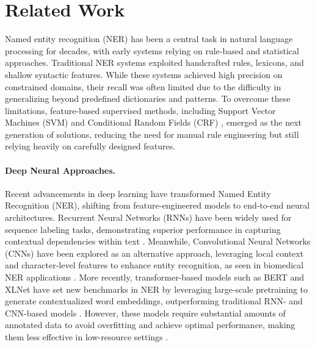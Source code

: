 \section{Related Work}
Named entity recognition (NER) has been a central task in natural language processing for decades, with early systems relying on rule-based and statistical approaches. Traditional NER systems \cite{Senapati2013Named-Entity, Danhui2014Rule-based, Sanglikar2011Named} exploited handcrafted rules, lexicons, and shallow syntactic features. While these systems achieved high precision on constrained domains, their recall was often limited due to the difficulty in generalizing beyond predefined dictionaries and patterns. To overcome these limitations, feature-based supervised methods, including Support Vector Machines (SVM) \cite{Lin2006Chinese, Paper2015A} and Conditional Random Fields (CRF) \cite{Guodong2011Geospatial, Tan2023Named}, emerged as the next generation of solutions, reducing the need for manual rule engineering but still relying heavily on carefully designed features.

\paragraph{Deep Neural Approaches.}  
Recent advancements in deep learning have transformed Named Entity Recognition (NER), shifting from feature-engineered models to end-to-end neural architectures. Recurrent Neural Networks (RNNs) have been widely used for sequence labeling tasks, demonstrating superior performance in capturing contextual dependencies within text \cite{Wu2017Clinical}. Meanwhile, Convolutional Neural Networks (CNNs) have been explored as an alternative approach, leveraging local context and character-level features to enhance entity recognition, as seen in biomedical NER applications \cite{Zhu2017GRAM}. More recently, transformer-based models such as BERT and XLNet have set new benchmarks in NER by leveraging large-scale pretraining to generate contextualized word embeddings, outperforming traditional RNN- and CNN-based models \cite{Lothritz2020Evaluating}. However, these models require substantial amounts of annotated data to avoid overfitting and achieve optimal performance, making them less effective in low-resource settings \cite{Ahmed2024Enriching}.

